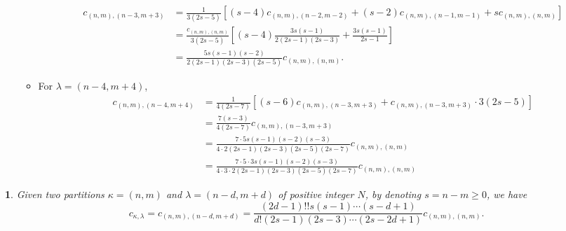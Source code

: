 \documentclass[10pt,oneside,american]{amsart}
\numberwithin{equation}{section}
\numberwithin{figure}{section}
\theoremstyle{definition}
\theoremstyle{remark}
\theoremstyle{plain}
\theoremstyle{definition}
\theoremstyle{plain}
\newtheorem{thm}{\protect\theoremname}[section]
\theoremstyle{plain}
\theoremstyle{plain}
\providecommand{\theoremname}{Theorem}
\begin{document}
\begin{enumerate}
\begin{itemize}
\begin{align*}
c_{\left(n,m\right),\left(n-3,m+3\right)} & =\frac{1}{3\left(2s-5\right)}\left[\left(s-4\right)c_{\left(n,m\right),\left(n-2,m-2\right)}+\left(s-2\right)c_{\left(n,m\right),\left(n-1,m-1\right)}+sc_{\left(n,m\right),\left(n,m\right)}\right]\\
 & =\frac{c_{\left(n,m\right),\left(n,m\right)}}{3\left(2s-5\right)}\left[\left(s-4\right)\frac{3s\left(s-1\right)}{2\left(2s-1\right)\left(2s-3\right)}+\frac{3s\left(s-1\right)}{2s-1}\right]\\
 & =\frac{5s\left(s-1\right)\left(s-2\right)}{2\left(2s-1\right)\left(2s-3\right)\left(2s-5\right)}c_{\left(n,m\right),\left(n,m\right)}.
\end{align*}
\item For $\lambda=\left(n-4,m+4\right)$, 
\begin{align*}
c_{\left(n,m\right),\left(n-4,m+4\right)} & =\frac{1}{4\left(2s-7\right)}\left[\left(s-6\right)c_{\left(n,m\right),\left(n-3,m+3\right)}+c_{\left(n,m\right),\left(n-3,m+3\right)}\cdot3\left(2s-5\right)\right]\\
 & =\frac{7\left(s-3\right)}{4\left(2s-7\right)}c_{\left(n,m\right),\left(n-3,m+3\right)}\\
 & =\frac{7\cdot5s\left(s-1\right)\left(s-2\right)\left(s-3\right)}{4\cdot2\left(2s-1\right)\left(2s-3\right)\left(2s-5\right)\left(2s-7\right)}c_{\left(n,m\right),\left(n,m\right)}\\
 & =\frac{7\cdot5\cdot3s\left(s-1\right)\left(s-2\right)\left(s-3\right)}{4\cdot3\cdot2\left(2s-1\right)\left(2s-3\right)\left(2s-5\right)\left(2s-7\right)}c_{\left(n,m\right),\left(n,m\right)}
\end{align*}
\end{itemize}
\end{enumerate}
\begin{thm}
Given two partitions $\kappa=\left(n,m\right)$ and $\lambda=\left(n-d,m+d\right)$
of positive integer $N$, by denoting $s=n-m\geq0$, we have 
\begin{equation}
c_{\kappa,\lambda}=c_{\left(n,m\right),\left(n-d,m+d\right)}=\frac{\left(2d-1\right)!!s\left(s-1\right)\cdots\left(s-d+1\right)}{d!\left(2s-1\right)\left(2s-3\right)\cdots\left(2s-2d+1\right)}c_{\left(n,m\right),\left(n,m\right)}.\label{eq:2PartRec}
\end{equation}
\end{thm}
\end{document}
